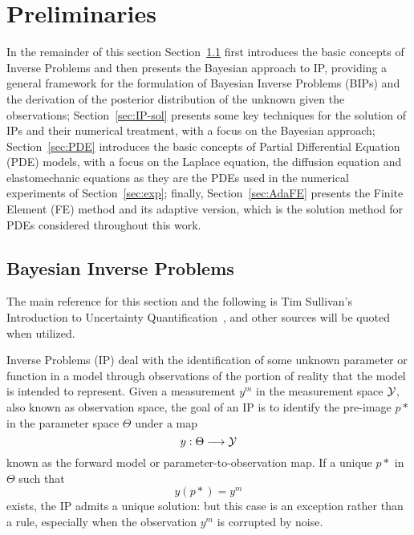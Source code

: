 \section{Preliminaries} \label{sec:preliminaries}

In the remainder of this section Section~\ref{sec:BIP} first introduces the basic concepts of Inverse Problems and then presents the Bayesian approach to IP, providing a general framework for the formulation of Bayesian Inverse Problems (BIPs) and the derivation of the posterior distribution of the unknown given the observations; Section~\ref{sec:IP-sol} presents some key techniques for the solution of IPs and their numerical treatment, with a focus on the Bayesian approach; Section~\ref{sec:PDE} introduces the basic concepts of Partial Differential Equation (PDE) models, with a focus on the Laplace equation, the diffusion equation and elastomechanic equations as they are the PDEs used in the numerical experiments of Section~\ref{sec:exp}; finally, Section~\ref{sec:AdaFE} presents the Finite Element (FE) method and its adaptive version, which is the solution method for PDEs considered throughout this work.

\subsection{Bayesian Inverse Problems}\label{sec:BIP}

The main reference for this section and the following is Tim Sullivan's Introduction to Uncertainty Quantification~\cite{Sullivan2015}, and other sources will be quoted when utilized. \medskip

Inverse Problems (IP) deal with the identification of some unknown parameter or function in a model through observations of the portion of reality that the model is intended to represent.\newline
Given a measurement $y^m$ in the measurement space $\mathcal Y$, also known as observation space, the goal of an IP is to identify the pre-image $p*$ in the parameter space $\Theta$ under a map \[y : \Theta \longrightarrow \mathcal Y \] known as the forward model or parameter-to-observation map.
If a unique $p*$ in $\Theta$ such that
\begin{equation}\label{eq:IP0}
    y(p*) = y^m
\end{equation}
exists, the IP admits a unique solution: but this case is an exception rather than a rule, especially when the observation $y^m$ is corrupted by noise.

